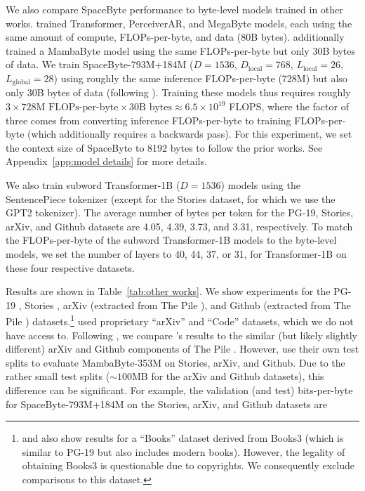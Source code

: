 We also compare SpaceByte performance to byte-level models trained in other works.
\citet{megabyte} trained Transformer, PerceiverAR, and MegaByte models, each using the same amount of compute, FLOPs-per-byte, and data (80B bytes).
\citet{mambabyte} additionally trained a MambaByte model using the same FLOPs-per-byte but only 30B bytes of data. We train SpaceByte-793M+184M ($D=1536$, $D_\text{local}=768$, $L_\text{local}=26$, $L_\text{global}=28$) using roughly the same inference FLOPs-per-byte (728M) but also only 30B bytes of data (following \citet{mambabyte}).
Training these models thus requires roughly $3 \times 728\text{M FLOPs-per-byte} \times 30\text{B bytes} \approx 6.5\times10^{19}$ FLOPS, where the factor of three comes from converting inference FLOPs-per-byte to training FLOPs-per-byte (which additionally requires a backwards pass). For this experiment, we set the context size of SpaceByte to 8192 bytes to follow the prior works. See Appendix~\ref{app:model details} for more details.

We also train subword Transformer-1B ($D=1536$) models using the SentencePiece tokenizer (except for the Stories dataset, for which we use the GPT2 tokenizer). The average number of bytes per token for the PG-19, Stories, arXiv, and Github datasets are 4.05, 4.39, 3.73, and 3.31, respectively. To match the FLOPs-per-byte of the subword Transformer-1B models to the byte-level models, we set the number of layers to 40, 44, 37, or 31, for Transformer-1B on these four respective datasets.

Results are shown in Table~\ref{tab:other works}. We show experiments for the PG-19 \cite{rae2020compressive}, Stories \cite{trinh2018stories}, arXiv (extracted from The Pile \cite{gao2020pile}), and Github (extracted from The Pile \cite{gao2020pile})
  datasets.\footnote{\label{foot:Books3}
    \citet{megabyte} and \citet{mambabyte} also show results for a ``Books'' dataset \cite{gao2020pile} derived from Books3 (which is similar to PG-19 but also includes modern books). However, the legality of obtaining Books3 is questionable due to copyrights. We consequently exclude comparisons to this dataset.}
\citet{megabyte} used proprietary ``arXiv'' and ``Code'' datasets, which we do not have access to. Following \citet{mambabyte},
  we compare \citet{megabyte}'s results to the similar (but likely slightly different) arXiv and Github components of The Pile \cite{gao2020pile}. However, \citet{mambabyte} use their own test splits to evaluate MambaByte-353M on Stories, arXiv, and Github. Due to the rather small test splits ($\sim100$MB for the arXiv and Github datasets), this difference can be significant. For example, the validation (and test) bits-per-byte for SpaceByte-793M+184M on the Stories, arXiv, and Github datasets are

